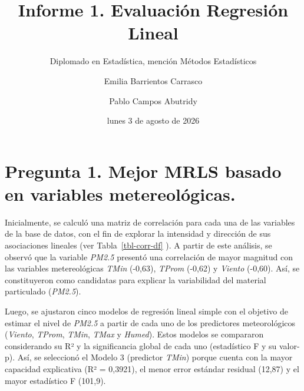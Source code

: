 \documentclass[
  spanish,
  letterpaper,
  DIV=11,
  numbers=noendperiod]{scrartcl}
\title{Informe 1. Evaluación Regresión Lineal}
\subtitle{Diplomado en Estadística, mención Métodos Estadísticos}
\author{Emilia Barrientos Carrasco \and Pablo Campos Abutridy}
\date{lunes 3 de agosto de 2026}
\begin{document}
\maketitle


\section{Pregunta 1. Mejor MRLS basado en variables
metereológicas.}\label{pregunta-1.-mejor-mrls-basado-en-variables-metereoluxf3gicas.}

Inicialmente, se calculó una matriz de correlación para cada una de las
variables de la base de datos, con el fin de explorar la intensidad y
dirección de sus asociaciones lineales (ver Tabla~\ref{tbl-corr-df} ). A
partir de este análisis, se observó que la variable \emph{PM2.5}
presentó una correlación de mayor magnitud con las variables
metereológicas \emph{TMin} (-0,63), \emph{TProm} (-0,62) y \emph{Viento}
(-0,60). Así, se constituyeron como candidatas para explicar la
variabilidad del material particulado (\emph{PM2.5}).

Luego, se ajustaron cinco modelos de regresión lineal simple con el
objetivo de estimar el nivel de \emph{PM2.5} a partir de cada uno de los
predictores meteorológicos (\emph{Viento}, \emph{TProm}, \emph{TMin},
\emph{TMax} y \emph{Humed}). Estos modelos se compararon considerando su
R² y la significancia global de cada uno (estadístico F y su valor-p).
Así, se seleccionó el Modelo 3 (predictor \emph{TMin}) porque cuenta con
la mayor capacidad explicativa (R² = 0,3921), el menor error estándar
residual (12,87) y el mayor estadístico F (101,9).
\end{document}
